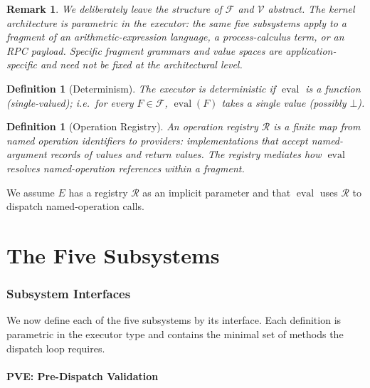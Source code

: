 \documentclass[twocolumn,11pt,a4paper]{article}
\newtheorem{definition}[theorem]{Definition}
\newtheorem{remark}[theorem]{Remark}
\DeclareMathOperator{\eval}{eval}
\newcommand{\Frag}{F}
\newcommand{\Vals}{\mathcal{V}}
\newcommand{\Exec}{E}
\newcommand{\Reg}{\mathcal{R}}
\begin{document}
\begin{remark}
We deliberately leave the structure of $\mathcal{F}$ and $\Vals$ abstract. The kernel architecture is parametric in the executor: the same five subsystems apply to a fragment of an arithmetic-expression language, a process-calculus term, or an RPC payload. Specific fragment grammars and value spaces are application-specific and need not be fixed at the architectural level.
\end{remark}

\begin{definition}[Determinism]
\label{def:exec-determinism}
The executor is \emph{deterministic} if $\eval$ is a function (single-valued); i.e.\ for every $\Frag \in \mathcal{F}$, $\eval(\Frag)$ takes a single value (possibly $\bot$).
\end{definition}

\begin{definition}[Operation Registry]
\label{def:registry}
An \emph{operation registry} $\Reg$ is a finite map from named operation identifiers to \emph{providers}: implementations that accept named-argument records of values and return values. The registry mediates how $\eval$ resolves named-operation references within a fragment.
\end{definition}

We assume $\Exec$ has a registry $\Reg$ as an implicit parameter and that $\eval$ uses $\Reg$ to dispatch named-operation calls.

\part{The Five Subsystems}

\section{Subsystem Interfaces}
\label{sec:subsystems}

We now define each of the five subsystems by its interface. Each definition is parametric in the executor type and contains the minimal set of methods the dispatch loop requires.

\subsection{PVE: Pre-Dispatch Validation}
\end{document}
